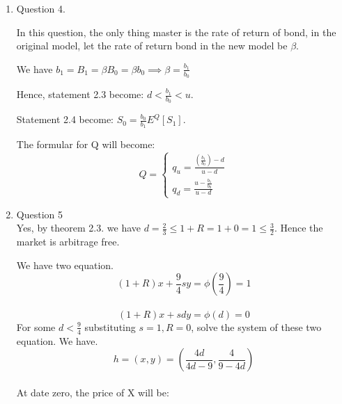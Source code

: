 \documentclass[]{book}
\theoremstyle{definition}
\begin{document}
\begin{enumerate}
\begin{proof}
From definition 2.4, we have: $S_0=s = \frac{1}{1+R}E^{Q}[S_1] = \frac{1}{1+R}\left[q_usu+q_dsd \right] =  \frac{1}{1+R}\left[q_usu+ (1-q_u)sd\right] = \frac{1}{1+R}\left[q_usu+ (1-q_u)sd\right] \implies 1+R = q_u(u-d) + d\implies q_u = \frac{(1+R)-d}{u-d}$.\\
Symmetric argument, $q_d = \frac{(u-1+R)}{u-d}$

\end{proof}

\begin{proof}
WLOG, suppose $X_1<X = \phi(Z)$ We can get "free money" by buying the contingentcy plan at price $X_1<\phi(Z)$ and recieve $\phi(Z)>X_1$
\end{proof}

\item Question 4.

In this question, the only thing master is the rate of return of bond, in the original model, let the rate of return bond in the new model be $\beta$.

We have $b_1=B_1 = \beta B_0 = \beta b_0 \implies  \beta = \frac{b_1}{b_0}$

Hence, statement 2.3 become: $d<\frac{b_1}{b_0}<u$.

Statement 2.4 become: $S_0= \frac{b_0}{b_1}E^{Q}[S_1]$.

The formular for Q will become:\\ 
\begin{equation*}
 Q = \left\{
        \begin{array}{ll}
            q_u = \frac{(\frac{b_1}{b_0})-d}{u-d}\\
            q_d = \frac{u-\frac{b_1}{b_0}}{u-d}
        \end{array}
    \right.
\end{equation*}
\item Question 5\\
Yes, by theorem 2.3. we have $d=\frac{2}{3} \leq 1+R =1+0=1 \leq \frac{3}{2}$. Hence the market is arbitrage free.

We have two equation.\\

$$(1+R)x +\frac{9}{4}sy = \phi(\frac{9}{4}) = 1$$\\
$$(1+R)x +sdy = \phi(d) = 0$$
For some $d < \frac{9}{4}$
substituting $s = 1, R = 0$, solve the system of these two equation. We have.\\
$$h=(x,y)=(\frac{4d}{4d-9},\frac{4}{9-4d})$$\\
At date zero, the price of X will be:


\end{enumerate}
\end{document}
